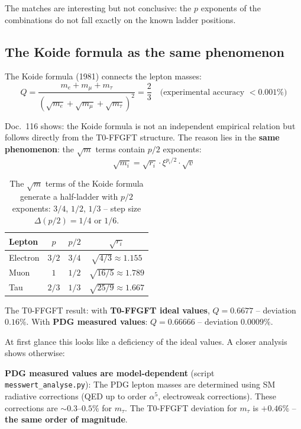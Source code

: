 The matches are interesting but not conclusive: the $p$ exponents
of the combinations do not fall exactly on the known ladder positions.

\subsection{The Koide formula as the same phenomenon}

The Koide formula (1981) connects the lepton masses:
\begin{equation}
    Q = \frac{m_e + m_\mu + m_\tau}
    {(\sqrt{m_e} + \sqrt{m_\mu} + \sqrt{m_\tau})^2} = \frac{2}{3}
    \quad \text{(experimental accuracy $< 0.001\%$)}
\end{equation}

Doc.~116 shows: the Koide formula is not an independent empirical
relation but follows directly from the T0-FFGFT structure. The
reason lies in the \textbf{same phenomenon}: the $\sqrt{m}$ terms
contain $p/2$ exponents:
\begin{equation}
    \sqrt{m_i} = \sqrt{r_i} \cdot \xi^{p_i/2} \cdot \sqrt{v}
\end{equation}

\begin{table}[htbp]
\centering\small
\begin{tabular}{lccc}
\toprule
\textbf{Lepton} & $p$ & $p/2$ & $\sqrt{r_i}$ \\
\midrule
Electron & $3/2$ & $3/4$ & $\sqrt{4/3} \approx 1.155$ \\
Muon     & $1$   & $1/2$ & $\sqrt{16/5} \approx 1.789$ \\
Tau      & $2/3$ & $1/3$ & $\sqrt{25/9} \approx 1.667$ \\
\bottomrule
\end{tabular}
\caption{The $\sqrt{m}$ terms of the Koide formula generate a
half-ladder with $p/2$ exponents: $3/4$, $1/2$, $1/3$ --
step size $\Delta(p/2) = 1/4$ or $1/6$.}
\label{tab:koide_p_en}
\end{table}

The T0-FFGFT result: with \textbf{T0-FFGFT ideal values}, $Q = 0.6677$ -- deviation $0.16\%$. With \textbf{PDG measured values}: $Q = 0.66666$ -- deviation $0.0009\%$.

At first glance this looks like a deficiency of the ideal values.
A closer analysis shows otherwise:

\textbf{PDG measured values are model-dependent} (script \texttt{messwert\_analyse.py}):
The PDG lepton masses are determined using SM radiative corrections
(QED up to order $\alpha^5$, electroweak corrections). These corrections
are $\sim 0.3$--$0.5\%$ for $m_\tau$. The T0-FFGFT deviation for
$m_\tau$ is $+0.46\%$ -- \textbf{the same order of magnitude}.


